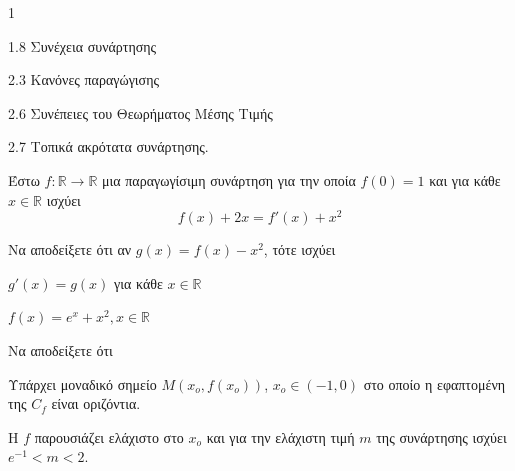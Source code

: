 \begin{ylh}{1}
    \item 1.8 Συνέχεια συνάρτησης
    \item 2.3 Κανόνες παραγώγισης
    \item 2.6 Συνέπειες του Θεωρήματος Μέσης Τιμής
    \item 2.7 Τοπικά ακρότατα συνάρτησης.
\end{ylh}
Έστω $f: \mathbb{R} \to \mathbb{R}$ μια παραγωγίσιμη συνάρτηση για την οποία $f(0)=1$ και για κάθε $x \in \mathbb{R}$ ισχύει
\[ f(x) + 2x = f'(x) + x^2 \]
\begin{alist}
\item Να αποδείξετε ότι αν $g(x) = f(x) - x^2$, τότε ισχύει
    \begin{rlist}
    \item $g'(x)=g(x)$ για κάθε $x \in \mathbb{R}$ 
    \item $f(x)=e^x + x^2, x \in \mathbb{R}$ 
    \end{rlist}
\item Να αποδείξετε ότι
    \begin{rlist}
    \item Υπάρχει μοναδικό σημείο $M(x_o, f(x_o))$, $x_o \in (-1, 0)$ στο οποίο η εφαπτομένη της $C_f$ είναι οριζόντια. 
    \item Η $f$ παρουσιάζει ελάχιστο στο $x_o$ και για την ελάχιστη τιμή $m$ της συνάρτησης ισχύει $e^{-1} < m < 2$. 
    \end{rlist}
\end{alist}